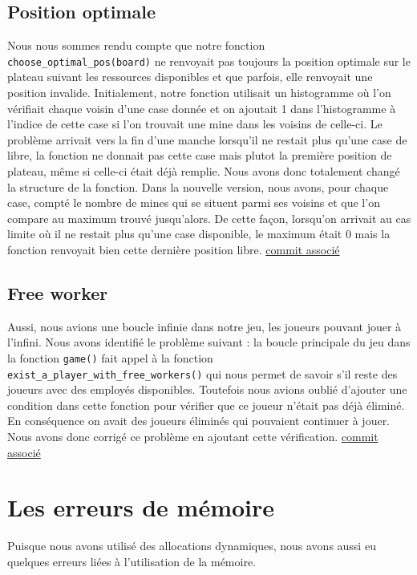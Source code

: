 \documentclass[a4paper,12pt]{report}
\begin{document}
\subsection*{Position optimale}
Nous nous sommes rendu compte que notre fonction \texttt{choose\_optimal\_pos(board)} ne renvoyait pas toujours la position optimale sur le plateau suivant les ressources disponibles et que parfois, elle renvoyait une position invalide. 
Initialement, notre fonction utilisait un histogramme où l'on vérifiait chaque voisin d'une case donnée et on ajoutait 1 dans l'histogramme à l'indice de cette case si l'on trouvait une mine dans les voisins de celle-ci. Le problème arrivait vers la fin d'une manche lorsqu'il ne restait plus qu'une case de libre, la fonction ne donnait pas cette case mais plutot la première position de plateau, même si celle-ci était déjà remplie. Nous avons donc totalement changé la structure de la fonction. Dans la nouvelle version, nous avons, pour chaque case, compté le nombre de mines qui se situent parmi ses voisins et que l'on compare au maximum trouvé jusqu'alors. De cette façon, lorsqu'on arrivait au cas limite où il ne restait plus qu'une case disponible, le maximum était 0 mais la fonction renvoyait bien cette dernière position libre. \href{https://thor.enseirb-matmeca.fr/git/pr103-24344/commit/?id=225bd9191fb65d16bc76c80a9a703afb792f3fd9}{commit associé}
\subsection*{Free worker}
Aussi, nous avions une boucle infinie dans notre jeu, les joueurs pouvant jouer à l'infini. Nous avons identifié le problème suivant : la boucle principale du jeu dans la fonction \texttt{game()} fait appel à la fonction \texttt{exist\_a\_player\_with\_free\_workers()} qui nous permet de savoir s'il reste des joueurs avec des employés disponibles. Toutefois nous avions oublié d'ajouter une condition dans cette fonction pour vérifier que ce joueur n'était pas déjà éliminé. En conséquence on avait des joueurs éliminés qui pouvaient continuer à jouer. Nous avons donc corrigé ce problème en ajoutant cette vérification. \href{https://thor.enseirb-matmeca.fr/git/pr103-24344/commit/?id=38d9878c6dab18e00bc192cc488c749d25cfc4df}{commit associé}
\section{Les erreurs de mémoire}
Puisque nous avons utilisé des allocations dynamiques, nous avons aussi eu quelques erreurs liées à l'utilisation de la mémoire.
\end{document}
